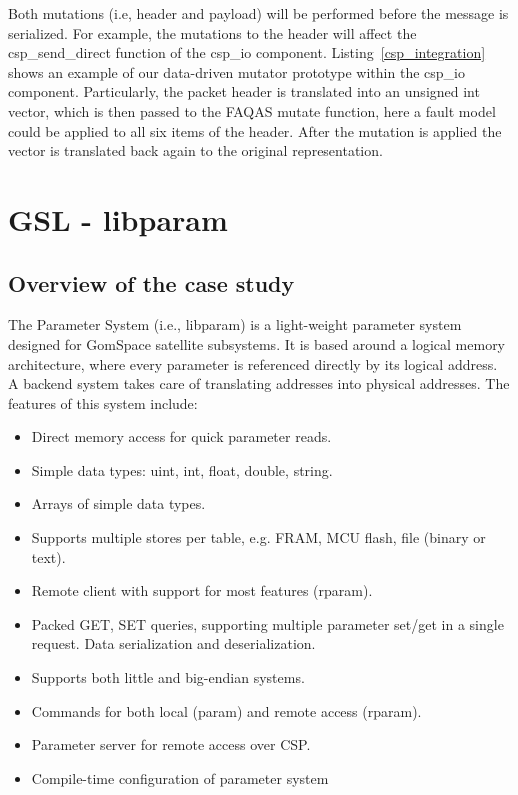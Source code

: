 


Both mutations (i.e, header and payload) will be performed before the message is serialized. 
For example, the mutations to the header will affect the csp\_send\_direct function of the csp\_io component. Listing~\ref{csp_integration} shows an example of our data-driven mutator prototype within the csp\_io component. Particularly, the packet header is translated into an unsigned int vector, which is then passed to the FAQAS mutate function, here a fault model could be applied to all six items of the header. After the mutation is applied the vector is translated back again to the original representation.
 

\section{GSL - libparam}
\label{sec:caseStudies:GSL:libparam}

\subsection{Overview of the case study}

The Parameter System (i.e., libparam) is a light-weight parameter system designed for GomSpace satellite subsystems. It is based around a logical memory architecture, where every parameter is referenced directly by its logical address. A backend system takes care of translating addresses into physical addresses.
The features of this system include:
\begin{itemize}
\item Direct memory access for quick parameter reads.
\item Simple data types: uint, int, float, double, string.
\item Arrays of simple data types.
\item Supports multiple stores per table, e.g. FRAM, MCU flash, file (binary or text).
\item Remote client with support for most features (rparam).
\item Packed GET, SET queries, supporting multiple parameter set/get in a single request. Data serialization and deserialization.
\item Supports both little and big-endian systems.
\item Commands for both local (param) and remote access (rparam).
\item Parameter server for remote access over CSP.
\item Compile-time configuration of parameter system
\end{itemize}

